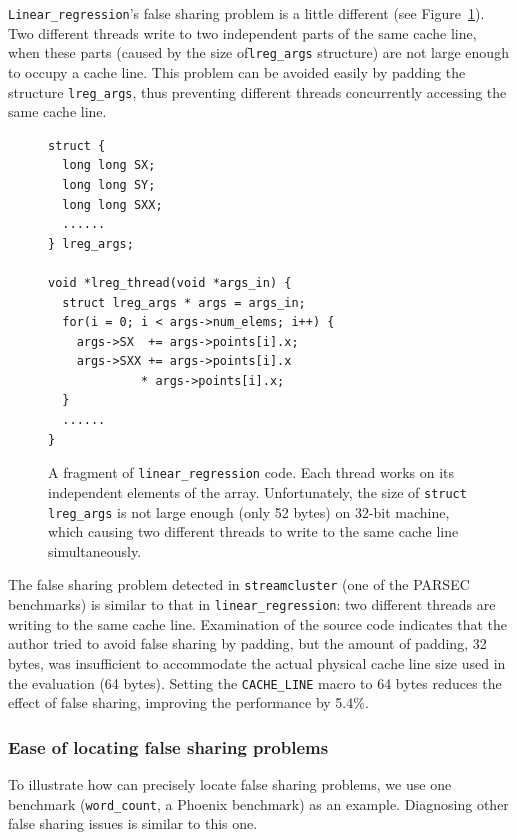 \texttt{Linear\_regression}'s false sharing problem is a little different (see Figure~\ref{fig:linear_regression}). 
Two different threads write to two independent parts of the same cache line, when these parts (caused by the size of\texttt{lreg\_args} structure) are not large enough to occupy a cache line. This problem can be avoided easily by padding the structure \texttt{lreg\_args}, thus preventing different threads concurrently accessing the same cache line. 

\begin{figure}[!t]
\begin{lstlisting}[style=tt]
struct {
  long long SX;
  long long SY;
  long long SXX;
  ......
} lreg_args;

void *lreg_thread(void *args_in) {
  struct lreg_args * args = args_in;
  for(i = 0; i < args->num_elems; i++) {
    args->SX  += args->points[i].x;
    args->SXX += args->points[i].x 
   	         * args->points[i].x;
  }
  ......	
}
\end{lstlisting}
\caption{A fragment of \texttt{linear\_regression} code. Each thread works on its independent elements of the array. 
Unfortunately, the size of \texttt{struct lreg\_args} is not large enough (only 52 bytes) on 32-bit machine, which causing two different threads to write to the same cache line simultaneously. 
\label{fig:linear_regression}}
\end{figure}

The false sharing problem detected in \texttt{streamcluster} (one of the PARSEC benchmarks) is similar to that in \texttt{linear\_regression}: two different threads are writing to the same cache line. Examination of the source code indicates that the author tried to avoid false sharing by padding, but the amount of padding, 32 bytes, was insufficient to accommodate the actual physical cache line size used in the evaluation (64 bytes). Setting the \texttt{CACHE\_LINE} macro to 64 bytes reduces the effect of false sharing, improving the performance by 5.4\%.


\subsubsection{Ease of locating false sharing problems}

\label{sec:fsfixexample}

To illustrate how \sheriffdetect{} can precisely locate false sharing problems, we use one benchmark (\texttt{word\_count}, a Phoenix benchmark) as an example. Diagnosing other false sharing issues is similar to this one.

